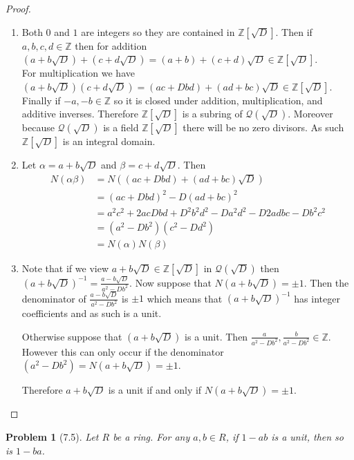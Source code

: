 \documentclass[10pt]{article}
\newcommand{\sk}{\vskip 10mm}
\newcommand{\bb}[1]{\mathbb{#1}}
\theoremstyle{plain}
\newtheorem{problem}{Problem}
\theoremstyle{remark}
\begin{document}
\begin{proof}
  \begin{enumerate}
  \item Both $0$ and $1$ are integers so they are contained in $\bb{Z}[\sqrt{D}]$.
    Then if $a,b,c,d\in \bb{Z}$ then for addition
    $(a+b\sqrt{D})+(c+d\sqrt{D})=(a+b)+(c+d)\sqrt{D}\in\bb{Z}[\sqrt{D}]$.\\
    For multiplication we have
    $(a+b\sqrt{D})(c+d\sqrt{D})=(ac+Dbd)+(ad+bc)\sqrt{D}\in\bb{Z}[\sqrt{D}]$.
    Finally if $-a,-b\in\bb{Z}$ so it is closed under addition, multiplication,
    and additive inverses. Therefore $\bb{Z}[\sqrt{D}]$ is a subring of
    $\mathcal{Q}(\sqrt{D})$. Moreover because $\mathcal{Q}(\sqrt{D})$ is a field
    $\bb{Z}[\sqrt{D}]$ there will be no zero divisors. As such $\bb{Z}[\sqrt{D}]$
    is an integral domain.
  \item Let $\alpha=a+b\sqrt{D}$ and $\beta=c+d\sqrt{D}$. Then
    \begin{align*}
      N(\alpha\beta)&=N((ac+Dbd)+(ad+bc)\sqrt{D})\\
           &=(ac+Dbd)^2-D(ad+bc)^2\\
           &=a^2c^2+2acDbd+D^2b^2d^2-Da^2d^2-D2adbc-Db^2c^2\\
           &=(a^2-Db^2)(c^2-Dd^2)\\
           &=N(\alpha)N(\beta)
    \end{align*}
  \item Note that if we view $a+b\sqrt{D}\in\bb{Z}[\sqrt{D}]$ in $\mathcal{Q}(\sqrt{D})$
    then $(a+b\sqrt{D})^{-1}=\frac{a-b\sqrt{D}}{a^2-Db^2}$. Now suppose that
    $N(a+b\sqrt{D})=\pm 1$. Then the denominator of $\frac{a-b\sqrt{D}}{a^2-Db^2}$
    is $\pm 1$ which means that $(a+b\sqrt{D})^{-1}$  has integer coefficients and
    as such is a unit.

    Otherwise suppose that $(a+b\sqrt{D})$ is a unit. Then
    $\frac{a}{a^2-Db^2},\frac{b}{a^2-Db^2}\in\bb{Z}$. However this can only
    occur if the denominator $(a^2-Db^2)=N(a+b\sqrt{D})=\pm 1$.

    Therefore $a+b\sqrt{D}$ is a unit if and only if $N(a+b\sqrt{D})=\pm 1$.
  \end{enumerate}
\end{proof}

\sk

\begin{problem}[7.5]
  Let $R$ be a ring. For any $a,b\in R$, if $1-ab$ is a unit, then so is $1-ba$.
\end{problem}
\end{document}
